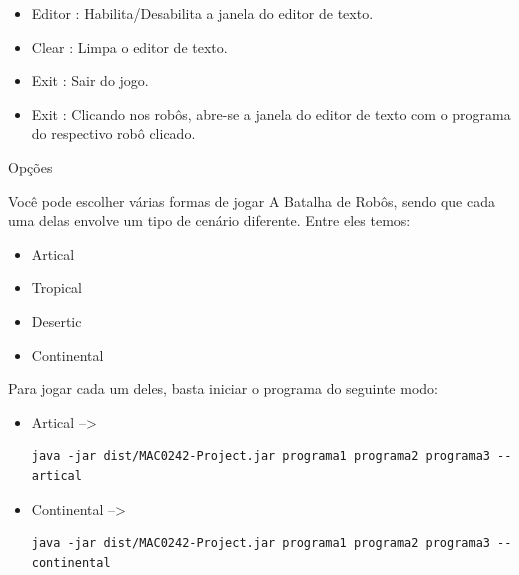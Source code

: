\documentclass[a4paper]{article}
\begin{document}
{{{{\begin{itemize}
 	    Primeiramente ele pergunta o nome do robô
 	    ser criado.
 	    
 	    Depois, caso o editor de texto esteja vazio
 	    ou desabilitado, ele pede um nome de programa
 	    já criado, para que ele possa comandar o robô.
 	    
 	    Caso o contrário, ele irá carregar o programa
 	    que foi digitado no editor de texto e salvá-lo
 	    na pasta user/ .
    \bigskip
     	    
 	\item \textcolor{NavyBlue}{Editor :}
 	    Habilita/Desabilita a janela do editor de texto.
 	\bigskip
 	
 	\item \textcolor{NavyBlue}{Clear :}
 	    Limpa o editor de texto.
 	\bigskip
 	    
 	\item \textcolor{NavyBlue}{Exit :}
 	    Sair do jogo.
 	\bigskip
 	    
 	\item \textcolor{NavyBlue}{Exit :}
 	    Clicando nos robôs, abre-se a janela do editor
 	    de texto com o programa do respectivo robô 
 	    clicado.

\end{itemize}


\newpage %
        
        
{\textcolor{NavyBlue}{\LARGE Opções}

Você pode escolher várias formas de jogar A Batalha de Robôs,
sendo que cada uma delas envolve um tipo de cenário diferente.
Entre eles temos:

\begin{itemize}
	\item Artical
	\item Tropical
	\item Desertic
	\item Continental
\end{itemize}

Para jogar cada um deles, basta iniciar o programa do seguinte modo:

\begin{itemize}

	\item Artical --> \begin{verbatim}java -jar dist/MAC0242-Project.jar programa1 programa2 programa3 --artical\end{verbatim}

	\item Continental --> \begin{verbatim}java -jar dist/MAC0242-Project.jar programa1 programa2 programa3 --continental\end{verbatim}
	

\end{itemize}}}}}}
\end{document}
